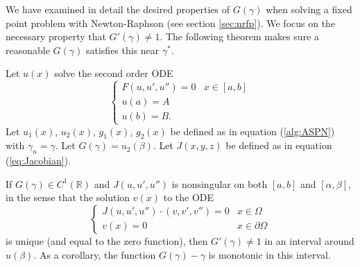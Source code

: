 \documentclass{article}
\begin{document}
We have examined in detail the desired properties of $G(\gamma)$ when solving a fixed point problem with Newton-Raphson (see section \ref{sec:nrfp}).
We focus on the necessary property that $G'(\gamma) \neq 1$.
The following theorem makes sure a reasonable $G(\gamma)$ satisfies this near $\gamma^*$.

\begin{thm}
Let $u(x)$ solve the second order ODE
\begin{equation*}
\begin{cases} F(u,u',u'') = 0 & x \in [a,b] \\ u(a) = A \\
u(b) = B . \end{cases}
\end{equation*}
Let $u_1(x)$, $u_2(x)$, $g_1(x)$, $g_2(x)$ be defined as in equation (\ref{alg:ASPN}) with $\gamma_n = \gamma$.
Let $G(\gamma) = u_2(\beta)$.
Let $J(x,y,z)$ be defined as in equation (\ref{eq:Jacobian}).

If $G(\gamma) \in C^1(\mathbb{R})$ and $J(u,u',u'')$ is nonsingular on both $[a,b]$ and $[\alpha,\beta]$, in the sense that the solution $v(x)$ to the ODE
\begin{equation*}
\begin{cases} J(u,u',u'') \cdot (v, v', v'') = 0 & x \in \Omega \\ v(x) = 0 & x \in \partial \Omega \end{cases}
\end{equation*}
is unique (and equal to the zero function),
then $G'(\gamma) \neq 1$ in an interval around $u(\beta)$.
As a corollary, the function $G(\gamma) - \gamma$ is monotonic in this interval.
\end{thm}
\end{document}
